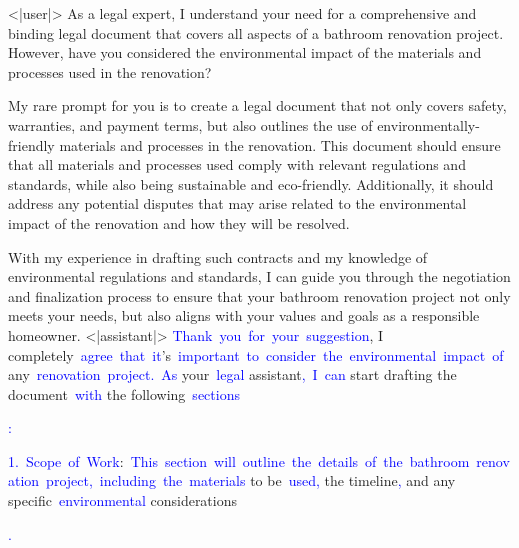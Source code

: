 \documentclass{article}
\begin{document}
\begin{tcolorbox}[colframe=black,colback=white]
<|user|>
As a legal expert, I understand your need for a comprehensive and binding legal document that covers all aspects of a bathroom renovation project. However, have you considered the environmental impact of the materials and processes used in the renovation? 

My rare prompt for you is to create a legal document that not only covers safety, warranties, and payment terms, but also outlines the use of environmentally-friendly materials and processes in the renovation. This document should ensure that all materials and processes used comply with relevant regulations and standards, while also being sustainable and eco-friendly. Additionally, it should address any potential disputes that may arise related to the environmental impact of the renovation and how they will be resolved.

With my experience in drafting such contracts and my knowledge of environmental regulations and standards, I can guide you through the negotiation and finalization process to ensure that your bathroom renovation project not only meets your needs, but also aligns with your values and goals as a responsible homeowner.
<|assistant|>
\textcolor{blue}{Thank}\textcolor{blue}{~you}\textcolor{blue}{~for}\textcolor{blue}{~your}\textcolor{blue}{~suggestion}, I completely\textcolor{blue}{~agree}\textcolor{blue}{~that}\textcolor{blue}{~it}'s\textcolor{blue}{~important}\textcolor{blue}{~to}\textcolor{blue}{~consider}\textcolor{blue}{~the}\textcolor{blue}{~environmental}\textcolor{blue}{~impact}\textcolor{blue}{~of} any\textcolor{blue}{~renovation}\textcolor{blue}{~project}\textcolor{blue}{.}\textcolor{blue}{~As} your\textcolor{blue}{~legal} assistant\textcolor{blue}{,}\textcolor{blue}{~I}\textcolor{blue}{~can} start drafting the document\textcolor{blue}{~with} the following\textcolor{blue}{~sections}\textcolor{blue}{:

}\textcolor{blue}{1}\textcolor{blue}{.}\textcolor{blue}{~Scope}\textcolor{blue}{~of}\textcolor{blue}{~Work}:\textcolor{blue}{~This}\textcolor{blue}{~section}\textcolor{blue}{~will}\textcolor{blue}{~outline}\textcolor{blue}{~the}\textcolor{blue}{~details}\textcolor{blue}{~of}\textcolor{blue}{~the}\textcolor{blue}{~bathroom}\textcolor{blue}{~renovation}\textcolor{blue}{~project}\textcolor{blue}{,}\textcolor{blue}{~including}\textcolor{blue}{~the}\textcolor{blue}{~materials} to be\textcolor{blue}{~used}\textcolor{blue}{,} the timeline\textcolor{blue}{,} and any specific\textcolor{blue}{~environmental} considerations\textcolor{blue}{.

}
\end{tcolorbox}
\end{document}
